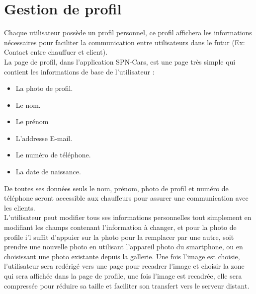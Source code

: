 \section{Gestion de profil}
Chaque utilisateur possède un profil personnel, ce profil affichera les informations nécessaires pour faciliter la communication entre utilisateurs dans le futur (Ex: Contact entre chauffuer et client).\\
\noindent La page de profil, dans l'application SPN-Cars, est une page très simple qui contient les informations de base de l'utilisateur :
\begin{itemize}
    \item La photo de profil.
    \item Le nom.
    \item Le prénom
    \item L'addresse E-mail.
    \item Le numéro de téléphone.
    \item La date de naissance.
\end{itemize}
De toutes ses données seuls le nom, prénom, photo de profil et numéro de téléphone seront accessible aux chauffeurs pour assurer une communication avec les clients.\\
\noindent L'utilisateur peut modifier tous ses informations personnelles tout simplement en modifiant les champs contenant l'information à changer, et pour la photo de profile i'l suffit d'appuier sur la photo pour la remplacer par une autre, soit prendre une nouvelle photo en utilisant l'appareil photo du smartphone, ou en choisissant une photo existante depuis la gallerie. Une fois l'image est choisie, l'utilisateur sera redérigé vers une page pour recadrer l'image et choisir la zone qui sera affichée dans la page de profile, une fois l'image est recadrée, elle sera compressée pour réduire sa taille et faciliter son transfert vers le serveur distant.
